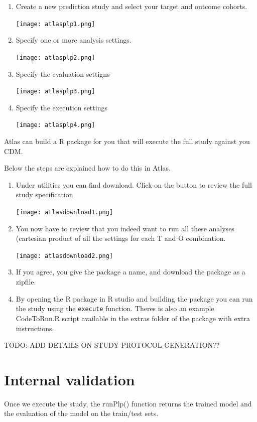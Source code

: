 \documentclass[]{article}
\begin{document}
\begin{enumerate}
\def\labelenumi{\arabic{enumi})}
\item
  Create a new prediction study and select your target and outcome
  cohorts.

  \texttt{[image: atlasplp1.png]}
\item
  Specify one or more analysis settings.

  \texttt{[image: atlasplp2.png]}

  \newpage
\item
  Specify the evaluation settigns

  \texttt{[image: atlasplp3.png]}
\item
  Specify the execution settings

  \texttt{[image: atlasplp4.png]}
\end{enumerate}

Atlas can build a R package for you that will execute the full study
against you CDM.

Below the steps are explained how to do this in Atlas.

\begin{enumerate}
\def\labelenumi{\arabic{enumi})}
\item
  Under utilities you can find download. Click on the button to review
  the full study specification

  \texttt{[image: atlasdownload1.png]}
\item
  You now have to review that you indeed want to run all these analyses
  (cartesian product of all the settings for each T and O combination.

  \texttt{[image: atlasdownload2.png]}
\item
  If you agree, you give the package a name, and download the package as
  a zipfile.
\item
  By opening the R package in R studio and building the package you can
  run the study using the \texttt{execute} function. Theres is also an
  example CodeToRun.R script available in the extras folder of the
  package with extra instructions.
\end{enumerate}

TODO: ADD DETAILS ON STUDY PROTOCOL GENERATION??

\section{Internal validation}\label{internal-validation}

Once we execute the study, the runPlp() function returns the trained
model and the evaluation of the model on the train/test sets.
\end{document}

